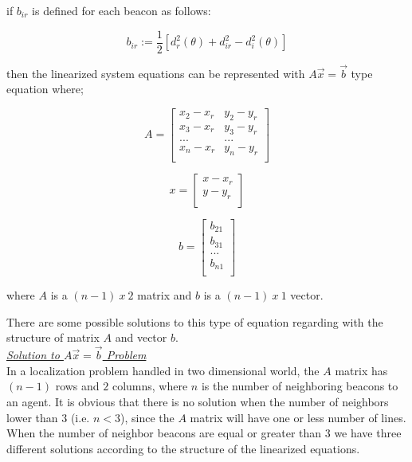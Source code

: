 if $b_{ir}$ is defined for each beacon as follows:

\begin{equation}
b_{ir} := \frac{1}{2}[d_r^2(\theta) + d_{ir}^2 - d_i^2(\theta)]
\end{equation}

then the linearized system equations can be represented with $A\vec{x} = \vec{b}$ type equation where;

\begin{equation}
A = \begin{bmatrix}
x_2 - x_r & y_2 - y_r\\
x_3 - x_r & y_3 - y_r\\
...       & ...      \\
x_n - x_r & y_n - y_r\\
\end{bmatrix}				
\end{equation}

\begin{equation}
x = \begin{bmatrix}
x - x_r\\
y - y_r\\
\end{bmatrix}
\end{equation}

\begin{equation}
b = \begin{bmatrix}
b_{21}\\
b_{31}\\
... \\
b_{n1}\\
\end{bmatrix}
\end{equation}

where $A$ is a $(n-1)\ x\ 2$ matrix and $b$ is a $(n-1)\ x\ 1$ vector.

There are some possible solutions to this type of equation regarding with the structure of matrix $A$ and vector $b$.\\

\underline {\textit{Solution to $A\vec{x} = \vec{b}$ Problem}}\\
In a localization problem handled in two dimensional world, the $A$ matrix has $(n-1)$ rows and $2$ columns, where $n$ is the number of neighboring beacons to an agent. It is obvious that there is no solution when the number of neighbors lower than $3$ (i.e. $n<3$), since the $A$ matrix will have one or less number of lines. When the number of neighbor beacons are equal or greater than $3$ we have three different solutions according to the structure of the linearized equations.


